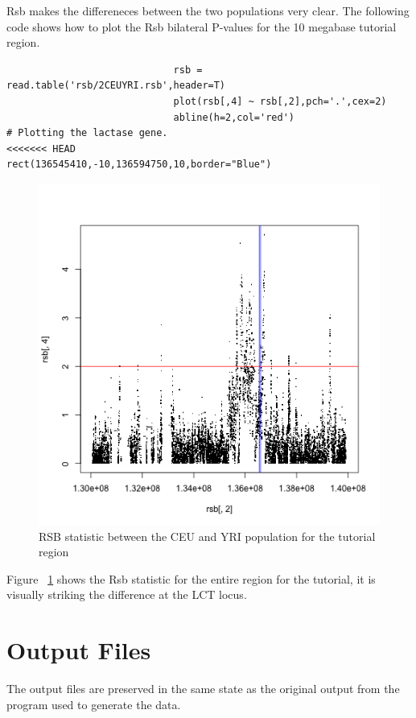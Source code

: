 \documentclass[a4paper,10pt]{article}
\begin{document}
                             Rsb makes the differeneces between the two populations very clear. The following code shows how to plot the Rsb bilateral P-values for the 10 megabase tutorial region.

                             \begin{verbatim}
                             rsb = read.table('rsb/2CEUYRI.rsb',header=T)
                             plot(rsb[,4] ~ rsb[,2],pch='.',cex=2)
                             abline(h=2,col='red')
# Plotting the lactase gene.
<<<<<<< HEAD
rect(136545410,-10,136594750,10,border="Blue")
\end{verbatim}

\begin{figure}
\centering
\includegraphics{pictures/RSBCEUYRI.png}
\caption{RSB statistic between the CEU and YRI population for the tutorial region} 
\label{fig:rsb}
\end{figure}
Figure ~\ref{fig:rsb} shows the Rsb statistic for the entire region for the tutorial, it is visually striking the difference at the LCT locus.

\pagebreak
\section{Output Files}
The output files are preserved in the same state as the original output from the program used to generate the data.
\end{document}
